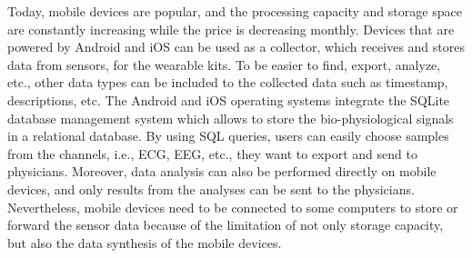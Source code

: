 Today, mobile devices are popular, and the processing capacity and storage space are constantly increasing while the price is decreasing monthly. Devices that are powered by Android and iOS can be used as a collector, which receives and stores data from sensors, for the wearable kits. To be easier to find, export, analyze, etc., other data types can be included to the collected data such as timestamp, descriptions, etc. The Android and iOS operating systems integrate the SQLite database management system which allows to store the bio-physiological signals in a relational database. By using SQL queries, users can easily choose samples from the channels, i.e., ECG, EEG, etc., they want to export and send to physicians. Moreover, data analysis can also be performed directly on mobile devices, and only results from the analyses can be sent to the physicians. Nevertheless, mobile devices need to be connected to some computers to store or forward the sensor data because of the limitation of not only storage capacity, but also the data synthesis of the mobile devices.
